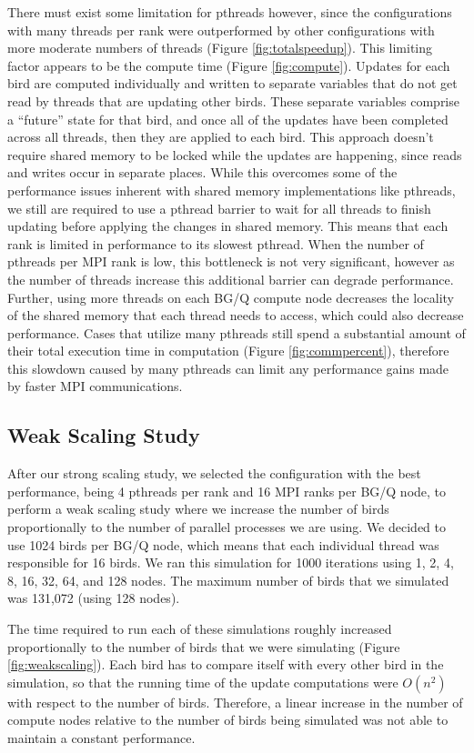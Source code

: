 There must exist some limitation for pthreads however, since the configurations
with many threads per rank were outperformed by other configurations with more
moderate numbers of threads (Figure \ref{fig:totalspeedup}). This limiting factor
appears to be the compute time (Figure \ref{fig:compute}). Updates for each
bird are computed individually and written to separate variables that do not
get read by threads that are updating other birds. These separate variables
comprise a ``future'' state for that bird, and once all of the updates have
been completed across all threads, then they are applied to each bird. This
approach doesn't require shared memory to be locked while the updates are happening,
since reads and writes occur in separate places. While this overcomes some of the
performance issues inherent with shared memory implementations like pthreads, we
still are required to use a pthread barrier to wait for all threads to finish
updating before applying the changes in shared memory. This means that each rank
is limited in performance to its slowest pthread. When the number of pthreads per
MPI rank is low, this bottleneck is not very significant, however as the number
of threads increase this additional barrier can degrade performance. Further,
using more threads on each BG/Q compute node decreases the locality of the shared
memory that each thread needs to access, which could also decrease performance.
Cases that utilize many pthreads still spend a substantial amount of their total
execution time in computation (Figure \ref{fig:commpercent}), therefore this
slowdown caused by many pthreads can limit any performance gains made by faster
MPI communications.

\subsection*{Weak Scaling Study}

After our strong scaling study, we selected the configuration with the best
performance, being 4 pthreads per rank and 16 MPI ranks per BG/Q node, to
perform a weak scaling study where we increase the number of birds proportionally
to the number of parallel processes we are using. We decided to use 1024 birds
per BG/Q node, which means that each individual thread was responsible for 16
birds. We ran this simulation for 1000 iterations using 1, 2, 4, 8, 16, 32, 64,
and 128 nodes. The maximum number of birds that we simulated was 131,072 (using
128 nodes).

The time required to run each of these simulations roughly increased proportionally
to the number of birds that we were simulating (Figure \ref{fig:weakscaling}).
Each bird has to compare itself with every other bird in the simulation, so that
the running time of the update computations were \(O(n^2)\) with respect to the
number of birds. Therefore, a linear increase in the number of compute nodes
relative to the number of birds being simulated was not able to maintain a
constant performance.

